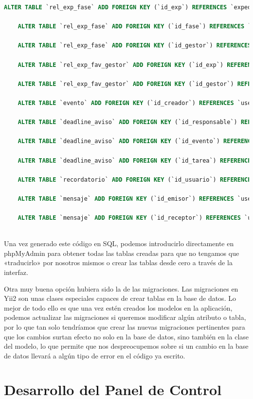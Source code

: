 \begin{lstlisting}[language=sql]
	ALTER TABLE `rel_exp_fase` ADD FOREIGN KEY (`id_exp`) REFERENCES `expediente` (`id`);
	
	ALTER TABLE `rel_exp_fase` ADD FOREIGN KEY (`id_fase`) REFERENCES `fase_expedient` (`id`);
	
	ALTER TABLE `rel_exp_fase` ADD FOREIGN KEY (`id_gestor`) REFERENCES `user` (`id`);
	
	ALTER TABLE `rel_exp_fav_gestor` ADD FOREIGN KEY (`id_exp`) REFERENCES `expediente` (`id`);
	
	ALTER TABLE `rel_exp_fav_gestor` ADD FOREIGN KEY (`id_gestor`) REFERENCES `user` (`id`);
	
	ALTER TABLE `evento` ADD FOREIGN KEY (`id_creador`) REFERENCES `user` (`id`);
	
	ALTER TABLE `deadline_aviso` ADD FOREIGN KEY (`id_responsable`) REFERENCES `user` (`id`);
	
	ALTER TABLE `deadline_aviso` ADD FOREIGN KEY (`id_evento`) REFERENCES `evento` (`id`);
	
	ALTER TABLE `deadline_aviso` ADD FOREIGN KEY (`id_tarea`) REFERENCES `tarea` (`id`);
	
	ALTER TABLE `recordatorio` ADD FOREIGN KEY (`id_usuario`) REFERENCES `user` (`id`);
	
	ALTER TABLE `mensaje` ADD FOREIGN KEY (`id_emisor`) REFERENCES `user` (`id`);
	
	ALTER TABLE `mensaje` ADD FOREIGN KEY (`id_receptor`) REFERENCES `user` (`id`);
	
\end{lstlisting}

Una vez generado este código en SQL, podemos introducirlo directamente en phpMyAdmin para obtener todas las tablas creadas para que no tengamos que «traducirlo» por nosotros mismos o crear las tablas desde cero a través de la interfaz.

Otra muy buena opción hubiera sido la de las migraciones. Las migraciones en Yii2 son unas clases especiales capaces de crear tablas en la base de datos. Lo mejor de todo ello es que una vez estén creados los modelos en la aplicación, podemos actualizar las migraciones si queremos modificar algún atributo o tabla, por lo que tan solo tendríamos que crear las nuevas migraciones pertinentes para que los cambios surtan efecto no solo en la base de datos, sino también en la clase del modelo, lo que permite que nos despreocupemos sobre si un cambio en la base de datos llevará a algún tipo de error en el código ya escrito.

\section{Desarrollo del Panel de Control}

